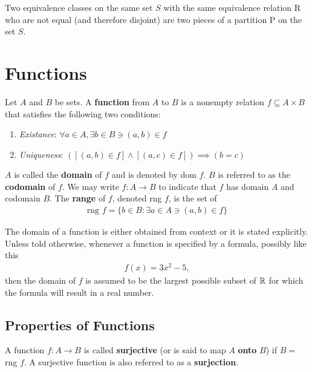 \begin{eg}
	Two equivalence classes on the same set $S$ with the same equivalence relation R who are not equal (and therefore disjoint) are two pieces of a partition P on the set $S$.
\end{eg}

\newpage
\section{Functions}

\begin{definition}
	Let $A$ and $B$ be sets. A \textbf{function} from $A$ to $B$ is a nonempty relation $f\subseteq A\times B$ that satisfies the following two conditions:
	\begin{enumerate}
		\item \textit{Existance}: $\forall a\in A, \exists b\in B \ni (a,b)\in f$
		\item \textit{Uniqueness}: $([(a,b)\in f] \land [(a,c)\in f]) \implies (b=c)$ 
	\end{enumerate}
	$A$ is called the \textbf{domain} of $f$ and is denoted by dom $f$. $B$ is referred to as the \textbf{codomain} of $f$. We may write $f:A\rightarrow B$ to indicate that $f$ has domain $A$ and codomain $B$. The \textbf{range} of $f$, denoted rng $f$, is the set of 
	\begin{align*}
		\text{rng } f = \{b\in B:\exists a\in A \ni (a,b)\in f\} 
	\end{align*}
\end{definition}

The domain of a function is either obtained from context or it is stated explicitly. Unless told otherwise, whenever a function is specified by a formula, possibly like this
\begin{align*}
	f(x) = 3x^2-5,
\end{align*}
then the domain of $f$ is assumed to be the largest possible subset of $\mathbb{R}$ for which the formula will result in a real number.

\newpage
\subsection{Properties of Functions}

\begin{definition}[Surjection]
	A function $f:A\rightarrow B$ is called \textbf{surjective} (or is said to map $A$ \textbf{onto} $B$) if $B=$ rng $f$. A surjective function is also referred to as a \textbf{surjection}.
\end{definition}


